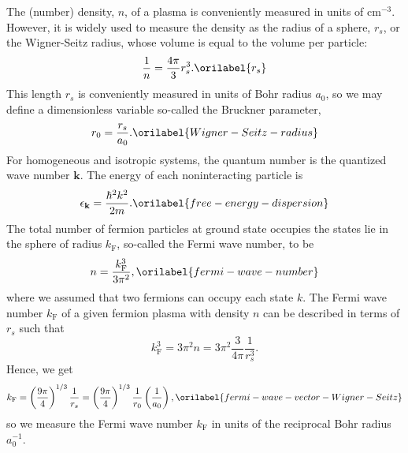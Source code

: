 \documentclass[aps,showkeys,noshowpacs,superscriptaddress,pre,preprint]{revtex4-2}
\let\label\orilabel
\begin{document}
The (number) density, $n$, of a plasma is conveniently measured in units of $\mathrm{cm}^{-3}$.
However, it is widely used to measure the density as the radius of a sphere, $r_s$, or
the Wigner-Seitz radius,
whose volume is equal to the volume per particle:
\begin{equation}
\frac{1}{n} = \frac{4\pi}{3} r_s^3 .
\label{r_s}
\end{equation}
This length $r_s$ is conveniently measured in units of Bohr radius $a_0$,
so we may define a dimensionless variable so-called the Bruckner parameter,
\begin{equation}
r_0 = \frac{r_s}{a_0} .
\label{Wigner-Seitz-radius}
\end{equation}
For homogeneous and isotropic systems,
the quantum number is the quantized wave number $\mathbf{k}$.
The energy of each noninteracting particle is
\begin{equation}
\epsilon_\mathbf{k} = \frac{\hbar^2 k^2}{2 m} .
\label{free-energy-dispersion}
\end{equation}
The total number of fermion particles at ground state occupies
the states lie in the sphere
of radius $k_\mathrm{F}$, so-called the Fermi wave number,
to be
\begin{equation}
n = \frac{k_\mathrm{F}^3}{3 \pi^2} ,
\label{fermi-wave-number}
\end{equation}
where we assumed that two fermions can occupy each state $k$.
The Fermi wave number $k_\mathrm{F}$ of a given fermion plasma with density $n$
can be described in terms of $r_s$ such that
\begin{equation*}
k_\mathrm{F}^3 = 3 \pi^2 n
= 3 \pi^2 \frac{3}{4\pi} \frac{1}{r_s^3} .
\end{equation*}
Hence, we get
\begin{equation}
k_\mathrm{F} 
= \left( \frac{9\pi}{4} \right)^{1/3} \frac{1}{r_s} 
= \left( \frac{9\pi}{4} \right)^{1/3} \frac{1}{r_0}
\left( \frac{1}{a_0} \right) ,
\label{fermi-wave-vector-Wigner-Seitz}
\end{equation}
so we measure the Fermi wave number $k_\mathrm{F}$ in units of the reciprocal Bohr radius $a_0^{-1}$.
\end{document}
